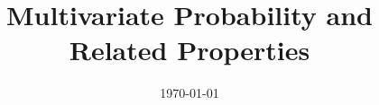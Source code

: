 \documentclass[11pt]{report}
\title{\textbf{Multivariate Probability and Related Properties}} %
\author{\scribe} %
\date{\today} %
\begin{document}
\maketitle	
\tableofcontents
\chapter{}

\end{document}
